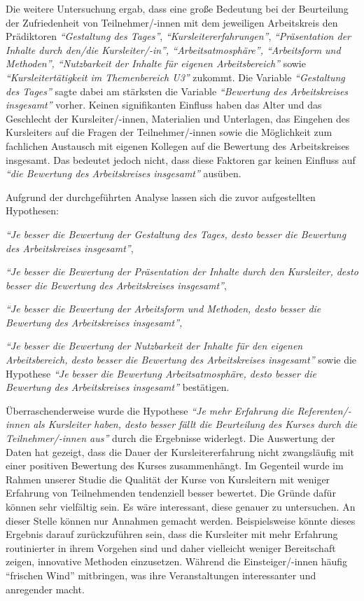 \documentclass[12pt,a4paper]{article}
\begin{document}
Die weitere Untersuchung ergab, dass eine große Bedeutung bei der Beurteilung der Zufriedenheit von Teilnehmer/-innen mit dem jeweiligen Arbeitskreis den Prädiktoren \textit{"`Gestaltung des Tages"'}, \textit{"`Kursleitererfahrungen"'}, \textit{"`Präsentation der Inhalte durch den/die Kursleiter/-in"', "`Ar\-beits\-at\-mos\-phä\-re"', "`Arbeitsform und Methoden"', "`Nutzbarkeit der Inhalte für eigenen Arbeitsbereich"'} sowie \textit{"`Kursleitertätigkeit im Themenbereich U3"'} zukommt. Die Variable \textit{"`Gestaltung des Tages"'} sagte dabei am stärksten die Variable \textit{"`Bewertung des Arbeitskreises insgesamt"'} vorher. Keinen signifikanten Einfluss haben das Alter und das Geschlecht der Kursleiter/-innen, Materialien und Unterlagen, das Eingehen des Kursleiters auf die Fragen der Teilnehmer/-innen sowie die Möglichkeit zum fachlichen Austausch mit eigenen Kollegen auf die Bewertung des Arbeitskreises insgesamt. Das bedeutet jedoch nicht, dass diese Faktoren gar keinen Einfluss auf \textit{"`die Bewertung des Arbeitskreises insgesamt"'} ausüben.

Aufgrund der durchgeführten Analyse lassen sich die zuvor aufgestellten Hypothesen:

\textit{"`Je besser die Bewertung der Gestaltung des Tages, desto besser die Bewertung des Arbeitskreises insgesamt"'},
 
\textit{"`Je besser die Bewertung der Präsentation der Inhalte durch den Kursleiter, desto besser die Bewertung des Arbeitskreises insgesamt"'},

\textit{"`Je besser die Bewertung der Arbeitsform und Methoden, desto besser die Bewertung des Arbeitskreises insgesamt"',}

\textit{"`Je besser die Bewertung der Nutzbarkeit der Inhalte für den eigenen Arbeitsbereich, desto besser die Bewertung des Arbeitskreises insgesamt"'}
sowie die Hypothese \textit{"`Je besser die Bewertung Arbeitsatmosphäre, desto besser die Bewertung des Arbeitskreises insgesamt"'} bestätigen.

Überraschenderweise wurde die Hypothese \textit{"`Je mehr Erfahrung die Re\-fe\-renten/-innen als Kursleiter haben, desto besser fällt die Beurteilung des Kurses durch die Teilnehmer/-innen aus"'} durch die Ergebnisse widerlegt. Die Auswertung der Daten hat gezeigt, dass die  Dauer der Kursleitererfahrung nicht zwangsläufig mit einer positiven Bewertung des Kurses zusammenhängt. Im Gegenteil wurde im Rahmen unserer Studie die Qualität der Kurse von Kursleitern mit weniger Erfahrung von Teilnehmenden tendenziell besser bewertet. Die Gründe dafür können sehr vielfältig sein. Es wäre interessant, diese genauer zu untersuchen. An dieser Stelle können nur Annahmen gemacht werden. Beispielsweise könnte dieses Ergebnis darauf zurückzuführen sein, dass die Kursleiter mit mehr Erfahrung routinierter in ihrem Vorgehen sind und daher vielleicht weniger Bereitschaft zeigen, innovative Methoden einzusetzen. Während die Einsteiger/-innen häufig "`frischen Wind"' mitbringen, was ihre Veranstaltungen interessanter und anregender macht.
\end{document}
